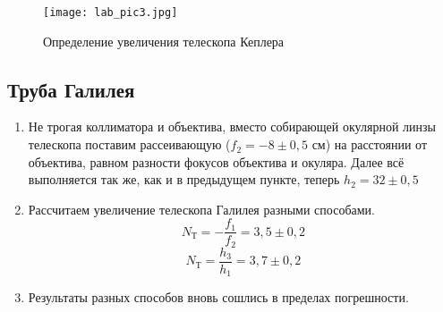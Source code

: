 \documentclass[a4paper,12pt]{article} %
\begin{document}
 \begin{figure}[h]
 \centering
 \texttt{[image: lab\_pic3.jpg]}
		\caption{Определение увеличения телескопа Кеплера}
  \end{figure}
\subsection{Труба Галилея}
\begin{enumerate}
    \item Не трогая коллиматора и объектива, вместо собирающей окулярной линзы телескопа поставим рассеивающую ($f_{2} = -8 \pm 0,5$ см) на расстоянии от объектива, равном разности фокусов объектива и окуляра. Далее всё выполняется так же, как и в предыдущем пункте, теперь $h_2 = 32 \pm 0,5$
    \item Рассчитаем увеличение телескопа Галилея разными способами.
    \begin{equation}
    N_{\text{Т}} = -\frac{f_{1}}{f_{2}} = 3,5 \pm 0,2
\end{equation}
\begin{equation}
        N_{\text{Т}} = \frac{h_{3}}{h_{1}} = 3,7 \pm 0,2
\end{equation}
\item Результаты разных способов вновь сошлись в пределах погрешности.
\end{enumerate}
\end{document}
